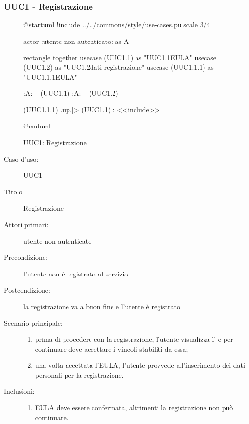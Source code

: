 \documentclass[casi-duso]{subfiles}
\begin{document}
\subsubsection{UUC1 - Registrazione}%
\label{subsub:UUC1utente}

\begin{figure}[h!]
  \centering
  \begin{plantuml}
  @startuml
  !include ../../commons/style/use-cases.pu
  scale 3/4

  actor :utente non autenticato: as A

  rectangle {
    together {
      usecase (UUC1.1) as "UUC1.1\nVisualizzazione EULA"
      usecase (UUC1.2) as "UUC1.2\nInserimento dati registrazione"
      usecase (UUC1.1.1) as "UUC1.1.1\nConferma EULA"
    }
  }

  :A: -- (UUC1.1)
  :A: -- (UUC1.2)

  (UUC1.1.1) .up.|> (UUC1.1) : <<include>>

  @enduml
  \end{plantuml} 
  \caption{UUC1: Registrazione}
  \label{fig:uuc1}
\end{figure}

\begin{description}
  \item[Caso d’uso:] UUC1
  \item[Titolo:] Registrazione
  \item[Attori primari:] utente non autenticato
  \item[Precondizione:] l'utente non è registrato al servizio.
  \item[Postcondizione:] la registrazione va a buon fine e l'utente è registrato.
  \item[Scenario principale:]
        \begin{enumerate}
          \item prima di procedere con la registrazione, l'utente visualizza l' e per continuare deve accettare i vincoli stabiliti da essa;
          \item una volta accettata l'EULA, l'utente provvede all'inserimento dei dati personali per la registrazione.
        \end{enumerate}
  \item[Inclusioni:]
        \begin{enumerate}
          \item EULA deve essere confermata, altrimenti la registrazione non può continuare.
        \end{enumerate}
\end{description}
\end{document}
